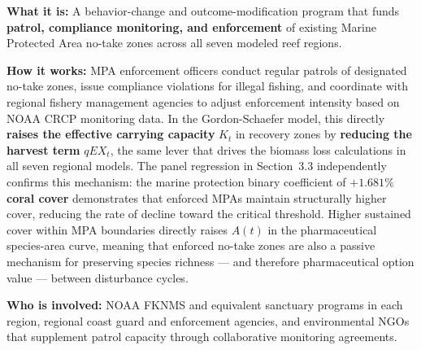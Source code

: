 \documentclass[10pt,letterpaper]{article}
\begin{document}
\begin{tcolorbox}[title=Program 5: MPA Monitoring Services --- \$6M Annual Total,
  colback=violet!5, colframe=violet!60!black, fonttitle=\bfseries, breakable]

  \textbf{What it is:} A behavior-change and outcome-modification program that funds
  \textbf{patrol, compliance monitoring, and enforcement} of existing Marine Protected Area
  no-take zones across all seven modeled reef regions.

  \medskip
  \textbf{How it works:} MPA enforcement officers conduct regular patrols of designated no-take
  zones, issue compliance violations for illegal fishing, and coordinate with regional fishery
  management agencies to adjust enforcement intensity based on NOAA CRCP monitoring data. In
  the Gordon-Schaefer model, this directly \textbf{raises the effective carrying capacity}
  $K_t$ in recovery zones by \textbf{reducing the harvest term} $qEX_t$, the same lever that
  drives the biomass loss calculations in all seven regional models. The panel regression in
  Section~3.3 independently confirms this mechanism: the marine protection binary coefficient
  of \textbf{$+1.681\%$ coral cover} demonstrates that enforced MPAs maintain structurally
  higher cover, reducing the rate of decline toward the critical threshold. Higher sustained
  cover within MPA boundaries directly raises $A(t)$ in the pharmaceutical species-area curve,
  meaning that enforced no-take zones are also a passive mechanism for preserving species
  richness --- and therefore pharmaceutical option value --- between disturbance cycles.

  \medskip
  \textbf{Who is involved:} NOAA FKNMS and equivalent sanctuary programs in each region,
  regional coast guard and enforcement agencies, and environmental NGOs that supplement patrol
  capacity through collaborative monitoring agreements.


\end{tcolorbox}
\end{document}
